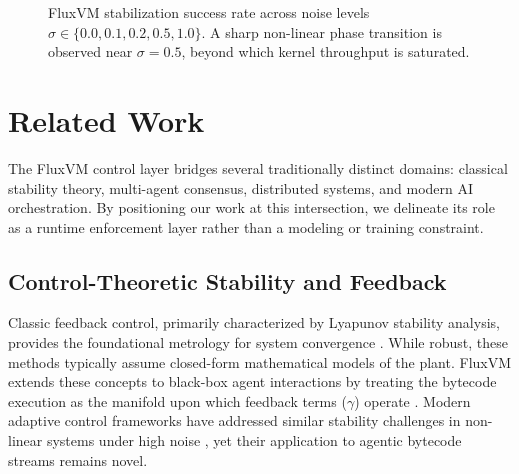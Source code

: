 \documentclass{article}
\begin{document}
\begin{figure}[h]
\centering
{}
\caption{FluxVM stabilization success rate across noise levels $\sigma \in \{0.0, 0.1, 0.2, 0.5, 1.0\}$. A sharp non-linear phase transition is observed near $\sigma = 0.5$, beyond which kernel throughput is saturated.}
\label{fig:noise_curve}
\end{figure}

\newpage

\section{Related Work}
\label{sec:related_work}

The FluxVM control layer bridges several traditionally distinct domains: classical stability theory, multi-agent consensus, distributed systems, and modern AI orchestration. By positioning our work at this intersection, we delineate its role as a runtime enforcement layer rather than a modeling or training constraint.

\subsection{Control-Theoretic Stability and Feedback}
Classic feedback control, primarily characterized by Lyapunov stability analysis, provides the foundational metrology for system convergence \cite{khalil2002nonlinear, lewis1998optimal}. While robust, these methods typically assume closed-form mathematical models of the plant. FluxVM extends these concepts to black-box agent interactions by treating the bytecode execution as the manifold upon which feedback terms ($\gamma$) operate \cite{astrom2010feedback, recht2019control}. Modern adaptive control frameworks have addressed similar stability challenges in non-linear systems under high noise \cite{astrom2008adaptive}, yet their application to agentic bytecode streams remains novel.
\end{document}
